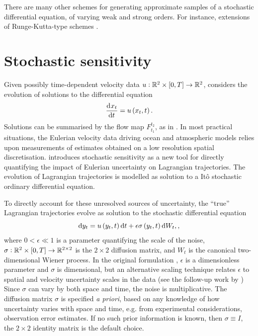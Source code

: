 There are many other schemes for generating approximate samples of a stochastic differential equation, of varying weak and strong orders.
For instance, extensions of Runge-Kutta-type schemes \citep{Roberts_2012_ModifyImprovedEuler,Rossler_2010_RungeKuttaMethodsStrong}.



\section{Stochastic sensitivity}
Given possibly time-dependent velocity data \(u: \mathbb{R}^2 \times [0,T] \to \mathbb{R}^2\), \citet{Balasuriya_2020_StochasticSensitivityComputable} considers the evolution of solutions to the differential equation
\[
	\dod{x_t}{t} = u\left(x_t, t\right).
\]
Solutions can be summarised by the flow map \(F_{t_1}^{t_2}\), as in .
In most practical situations, the Eulerian velocity data driving ocean and atmospheric models relies upon measurements of estimates obtained on a low resolution spatial discretisation.
\citet{Balasuriya_2020_StochasticSensitivityComputable} introduces stochastic sensitivity as a new tool for directly quantifying the impact of Eulerian uncertainty on Lagrangian trajectories.
The evolution of Lagrangian trajectories is modelled as solution to a It\^o stochastic ordinary differential equation.

To directly account for these unresolved sources of uncertainty, the ``true'' Lagrangian trajectories evolve as solution to the stochastic differential equation
\begin{equation}
	\sde{y_t}{u\left(y_t, t\right)}{\epsilon\sigma\left(y_t, t\right)},
	\label{eqn:ss_sde},
\end{equation}
where \(0 < \epsilon \ll 1\) is a parameter quantifying the scale of the noise, \(\sigma:	\mathbb{R}^2\times[0,T] \to \mathbb{R}^{2\times 2}\) is the \(2\times 2\) diffusion matrix, and \(W_t\) is the canonical two-dimensional Wiener process.
In the original formulation \citep{Balasuriya_2020_StochasticSensitivityComputable}, \(\epsilon\) is a dimensionless parameter and \(\sigma\) is dimensional, but an alternative scaling technique relates \(\epsilon\) to spatial and velocity uncertainty scales in the data (see the follow-up work by \citet{BadzaEtAl_2023_HowSensitiveAre,Balasuriya_2020_UncertaintyFinitetimeLyapunov,FangEtAl_2020_DisentanglingResolutionPrecision})
Since \(\sigma\) can vary by both space and time, the noise is multiplicative.
The diffusion matrix \(\sigma\) is specified \emph{a priori}, based on any knowledge of how uncertainty varies with space and time, e.g. from experimental considerations, observation error estimates.
If no such prior information is known, then \(\sigma \equiv I\), the \(2 \times 2\) identity matrix is the default choice.

